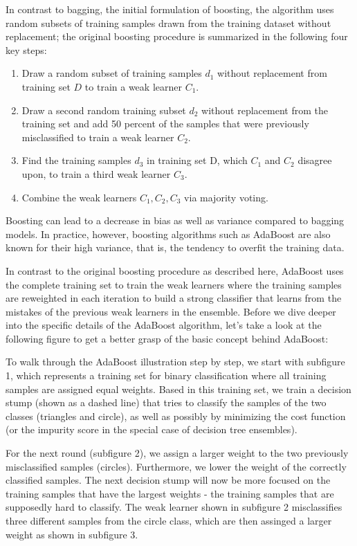 \documentclass[11pt]{article}
\providecommand{\tightlist}{%
      \setlength{\itemsep}{0pt}\setlength{\parskip}{0pt}}
\begin{document}
    In contrast to bagging, the initial formulation of boosting, the
algorithm uses random subsets of training samples drawn from the
training dataset without replacement; the original boosting procedure is
summarized in the following four key steps:

\begin{enumerate}
\def\labelenumi{\arabic{enumi}.}
\tightlist
\item
  Draw a random subset of training samples \(d_1\) without replacement
  from training set \(D\) to train a weak learner \(C_1\).
\item
  Draw a second random training subset \(d_2\) without replacement from
  the training set and add 50 percent of the samples that were
  previously misclassified to train a weak learner \(C_2\).
\item
  Find the training samples \(d_3\) in training set D, which \(C_1\) and
  \(C_2\) disagree upon, to train a third weak learner \(C_3\).
\item
  Combine the weak learners \(C_1, C_2, C_3\) via majority voting.
\end{enumerate}

Boosting can lead to a decrease in bias as well as variance compared to
bagging models. In practice, however, boosting algorithms such as
AdaBoost are also known for their high variance, that is, the tendency
to overfit the training data.

In contrast to the original boosting procedure as described here,
AdaBoost uses the complete training set to train the weak learners where
the training samples are reweighted in each iteration to build a strong
classifier that learns from the mistakes of the previous weak learners
in the ensemble. Before we dive deeper into the specific details of the
AdaBoost algorithm, let's take a look at the following figure to get a
better grasp of the basic concept behind AdaBoost:

To walk through the AdaBoost illustration step by step, we start with
subfigure 1, which represents a training set for binary classification
where all training samples are assigned equal weights. Based in this
training set, we train a decision stump (shown as a dashed line) that
tries to classify the samples of the two classes (triangles and circle),
as well as possibly by minimizing the cost function (or the impurity
score in the special case of decision tree ensembles).

For the next round (subfigure 2), we assign a larger weight to the two
previously misclassified samples (circles). Furthermore, we lower the
weight of the correctly classified samples. The next decision stump will
now be more focused on the training samples that have the largest
weights - the training samples that are supposedly hard to classify. The
weak learner shown in subfigure 2 misclassifies three different samples
from the circle class, which are then assinged a larger weight as shown
in subfigure 3.
\end{document}
